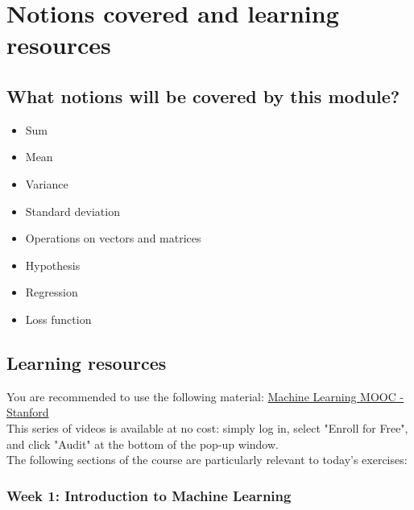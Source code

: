 

\chapter*{Notions covered and learning resources}

\section*{What notions will be covered by this module?}

\begin{itemize}
    \item Sum
    \item Mean
    \item Variance
    \item Standard deviation
    \item Operations on vectors and matrices
    \item Hypothesis
    \item Regression
    \item Loss function
\end{itemize}

\section*{Learning resources}

You are recommended to use the following material: \href{https://www.coursera.org/learn/machine-learning}{Machine Learning MOOC - Stanford}\\
\newline
This series of videos is available at no cost: simply log in, select "Enroll for Free", and click "Audit" at the bottom of the pop-up window.\\
\newline
The following sections of the course are particularly relevant to today's exercises: 

\subsection*{Week 1: Introduction to Machine Learning}

